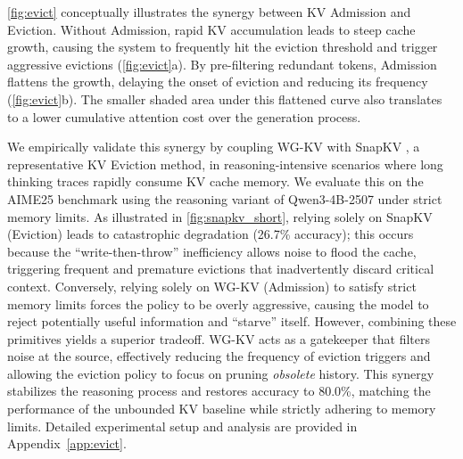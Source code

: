 \cref{fig:evict} conceptually illustrates the synergy between KV Admission and Eviction. Without Admission, rapid KV accumulation leads to steep cache growth, causing the system to frequently hit the eviction threshold and trigger aggressive evictions (\cref{fig:evict}a). By pre-filtering redundant tokens, Admission flattens the growth, delaying the onset of eviction and reducing its frequency (\cref{fig:evict}b). The smaller shaded area under this flattened curve also translates to a lower cumulative attention cost over the generation process.



We empirically validate this synergy by coupling WG-KV with SnapKV \cite{snapkv}, a representative KV Eviction method, in reasoning-intensive scenarios where long thinking traces rapidly consume KV cache memory. We evaluate this on the AIME25 benchmark \cite{aime25} using the reasoning variant of Qwen3-4B-2507 under strict memory limits. As illustrated in \cref{fig:snapkv_short}, relying solely on SnapKV (Eviction) leads to catastrophic degradation (26.7\% accuracy); this occurs because the ``write-then-throw'' inefficiency allows noise to flood the cache, triggering frequent and premature evictions that inadvertently discard critical context. Conversely, relying solely on WG-KV (Admission) to satisfy strict memory limits forces the policy to be overly aggressive, causing the model to reject potentially useful information and ``starve'' itself. However, combining these primitives yields a superior tradeoff. WG-KV acts as a gatekeeper that filters noise at the source, effectively reducing the frequency of eviction triggers and allowing the eviction policy to focus on pruning \textit{obsolete} history. This synergy stabilizes the reasoning process and restores accuracy to 80.0\%, matching the performance of the unbounded KV baseline while strictly adhering to memory limits. Detailed experimental setup and analysis are provided in Appendix~\ref{app:evict}.